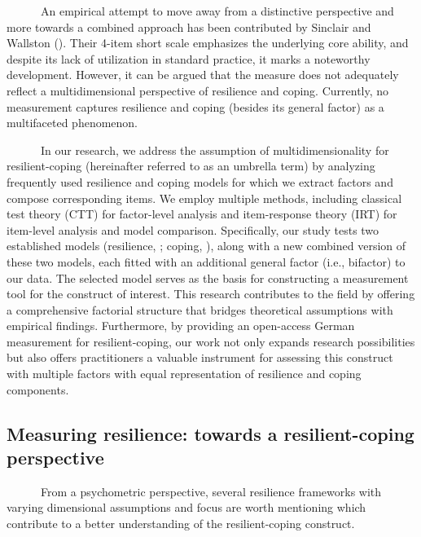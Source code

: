 \documentclass[
  man,floatsintext]{apa7}
\begin{document}
~~~~~~An empirical attempt to move away from a distinctive perspective and more towards a combined approach has been contributed by Sinclair and Wallston (). Their 4-item short scale emphasizes the underlying core ability, and despite its lack of utilization in standard practice, it marks a noteworthy development. However, it can be argued that the measure does not adequately reflect a multidimensional perspective of resilience and coping. Currently, no measurement captures resilience and coping (besides its general factor) as a multifaceted phenomenon.

~~~~~~In our research, we address the assumption of multidimensionality for resilient-coping (hereinafter referred to as an umbrella term) by analyzing frequently used resilience and coping models for which we extract factors and compose corresponding items. We employ multiple methods, including classical test theory (CTT) for factor-level analysis and item-response theory (IRT) for item-level analysis and model comparison. Specifically, our study tests two established models (resilience, ; coping, ), along with a new combined version of these two models, each fitted with an additional general factor (i.e., bifactor) to our data. The selected model serves as the basis for constructing a measurement tool for the construct of interest. This research contributes to the field by offering a comprehensive factorial structure that bridges theoretical assumptions with empirical findings. Furthermore, by providing an open-access German measurement for resilient-coping, our work not only expands research possibilities but also offers practitioners a valuable instrument for assessing this construct with multiple factors with equal representation of resilience and coping components.

\subsection{Measuring resilience: towards a resilient-coping perspective}\label{measuring-resilience-towards-a-resilient-coping-perspective}

~~~~~~From a psychometric perspective, several resilience frameworks with varying dimensional assumptions and focus are worth mentioning which contribute to a better understanding of the resilient-coping construct.
\end{document}
